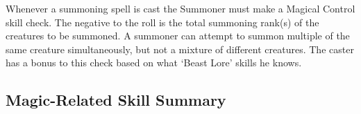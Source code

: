 \documentclass[twoside]{book}
\begin{document}
    {  
     Whenever a summoning spell is cast the Summoner
               must make a Magical Control skill check. The negative to
               the roll is the total summoning rank(s) of the creatures
               to be summoned. A summoner can attempt to summon multiple
               of the same creature simultaneously, but not a mixture of
               different creatures. The caster has a bonus to this check
               based on what `Beast Lore' skills he knows.
               
    }
  
    

\subsection{Magic-Related Skill Summary}
    
\end{document}
